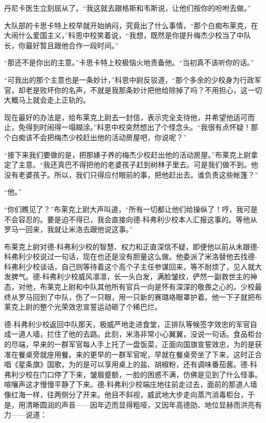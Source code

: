     丹尼卡医生立刻屈从了。“我这就去跟格斯和韦斯说，让他们按你的吩咐去做。”

    大队部的卡思卡特上校早就开始纳闷，究竟出了什么事情，“那个白痴布莱克，在大闹什么爱国主义，”科恩中校笑着说，“我想，既然是你提升梅杰少校当了中队长，你最好暂且跟他合作一段时间。”

    “那还不是你出的主意。”卡思卡特上校极恼火地责备他。“当初真不该听你的话。”

    “可我出的那个主意也是一条妙计，”科恩中尉反驳道，“那个多余的少校身为行政军官，却老是败坏你的名声，不就是我那条妙计把他给除掉了吗？不用担心，这一切大概马上就会走上正轨的。

    现在最好的办法是，给布莱克上尉去一封信，表示完全支待他，并希望他适可而止，免得到时闹得一塌糊涂。”科恩中校突然想出了个怪念头。“我很有点怀疑！那个白痴该不会把梅杰少校赶出他的活动房屋吧，你说呢？”

 


    “接下来我们要做的是，把那婊子养的梅杰少校赶出他的活动房屋。”布莱克上尉拿定了主意。“我还真巴不得把他的老婆孩子赶到树林子里去。可是我们做不到。他没有老婆孩子。所以，我们只得应付眼前的事，把他赶出去。谁负责这些帐篷？”

    “他。”

    “你们瞧见了？”布莱克上尉大声叫道，“所有一切都让他们给操纵了！哼，我可是不会容忍的。要是迫不得已，我会直接向德-科弗利少校本人汇报这事的。等他从罗马一回来，我就让米洛去跟他说这事。”

    布莱克上尉对德-科弗利少校的智慧、权力和正直深信不疑，即便他以前从未跟德-科弗利少校说过一句话，现在也还是没有胆量这么做。他委派了米洛替他去找德-科弗利少校谈话，自己则等待着这个高个子主任参谋回来，等不耐烦了，见人就大发脾气。德-科弗利少校威风凛凛，长一头白发，满脸皱纹，俨然一副救世主的神态，对他，布莱克上尉和中队其他所有官兵一向是怀有深深的敬畏之心的。少校最终从罗马回到了中队，伤了一只眼，用一只新的赛璐珞眼罩护着。他一下子就把布莱克上尉的整个光荣效忠宣誓运动砸了个稀巴烂。

    德-科弗利少校返回中队那天，极威严地走进食堂，正排队等候签字效忠的军官自成一道人墙，拦住了他的去路。此刻，米洛非常小心翼翼，没说一句话。食品柜台的尽端，早来的一群军官每人手上托了一盘饭菜，正面向国旗宣誓效忠，为的是获准在餐桌旁就座用餐。来的更早的一群军官呢，早就在餐桌旁坐了下来，这时正合唱《星条旗》国歌，为的是可以享用桌上的盐、胡椒粉，还有调味番茄酱。德-科弗利少校在门口停了下来，皱眉蹙额，一脸的困惑不满，仿佛是见到了什么怪事。喧嚷声这才慢慢平静了下来。德-科弗利少校端庄地往前走过去，面前的那道人墙像红海一样，往两侧分了开来。他目不斜视，威武地大步走向蒸汽消毒柜台，于是，用清晰圆润的声音——因年迈而显得粗哑，又因年高德劭、地位显赫而洪亮有力——说道：

